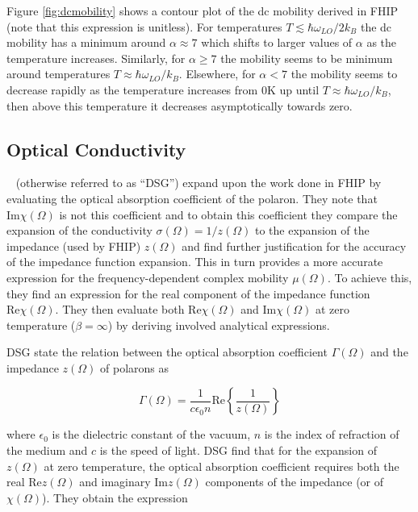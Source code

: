 Figure \ref{fig:dcmobility} shows a contour plot of the dc mobility derived in FHIP (note that this expression is unitless). For temperatures $T \lesssim \hbar \omega_{LO} / 2 k_B$ the dc mobility has a minimum around $\alpha \approx 7$ which shifts to larger values of $\alpha$ as the temperature increases. Similarly, for $\alpha \geq 7$ the mobility seems to be minimum around temperatures $T \approx \hbar \omega_{LO} / k_B$. Elsewhere, for $\alpha < 7$ the mobility seems to decrease rapidly as the temperature increases from $0$K up until $T \approx \hbar \omega_{LO} / k_B$, then above this temperature it decreases asymptotically towards zero.

\subsection{Optical Conductivity}
\label{subsec:2-3-2}

~\cite{devreese_optical_1972} (otherwise referred to as ``DSG'') expand upon the work done in FHIP by evaluating the optical absorption coefficient of the polaron. They note that $\text{Im}\chi(\Omega)$ is not this coefficient and to obtain this coefficient they compare the expansion of the conductivity $\sigma(\Omega) = 1 / z(\Omega)$ to the expansion of the impedance (used by FHIP) $z(\Omega)$ and find further justification for the accuracy of the impedance function expansion. This in turn provides a more accurate expression for the frequency-dependent complex mobility $\mu(\Omega)$. To achieve this, they find an expression for the real component of the impedance function $\text{Re}\chi(\Omega)$. They then evaluate both $\text{Re}\chi(\Omega)$ and $\text{Im}\chi(\Omega)$ at zero temperature ($\beta = \infty$) by deriving involved analytical expressions. 

DSG state the relation between the optical absorption coefficient $\Gamma(\Omega)$ and the impedance $z(\Omega)$ of polarons as

\begin{equation}
    \Gamma(\Omega) = \frac{1}{c\epsilon_0 n} \text{Re} \left\{ \frac{1}{z(\Omega)} \right\}
\end{equation}

where $\epsilon_0$ is the dielectric constant of the vacuum, $n$ is the index of refraction of the medium and $c$ is the speed of light. DSG find that for the expansion of $z(\Omega)$ at zero temperature, the optical absorption coefficient requires both the real $\text{Re} z(\Omega)$ and imaginary $\text{Im} z(\Omega)$ components of the impedance (or of $\chi(\Omega)$). They obtain the expression

